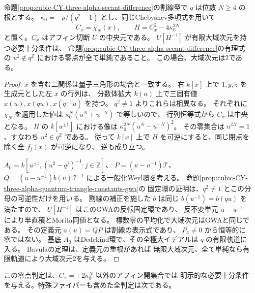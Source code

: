 \begin{proposition}\label{prop:cubic-CY-three-alpha-secant-finite-affine-open}
命題\ref{prop:cubic-CY-three-alpha-secant-difference}の割線型で
$q$ は位数 $N\ge4$ の根とする。
$\kappa_0=-\rho/(q^2-1)$ とし、同じChebyshev多項式を用いて
\[
 C_x=\chi_N(x),\qquad H=C_x^2-4\kappa_0^{2N}
\]
と置く。$C_x$ はアフィン切断 $U$ の中央元である。
$U[H^{-1}]$ が有限大域次元を持つ必要十分条件は、
命題\ref{prop:cubic-CY-three-alpha-secant-difference}の有理式の
$u^2\notin q^{\mathbb Z}$ における零点が全て単純であること。
この場合、大域次元は2である。
\end{proposition}
\begin{proof}
$x$ を含む二関係は量子三角形の場合と一致する。
右 $k[x]$ 上で $1,y,z$ を生成元とした左 $x$ の行列は、
分数体拡大 $k(u)$ 上で三固有値 $x(u),x(qu),x(q^{-1}u)$ を持つ。
$q^2\ne1$ よりこれらは相異なる。
それぞれに $\chi_N$ を適用した値は $\kappa_0^N(u^N+u^{-N})$ で等しいので、
行列恒等式から $C_x$ は中央となる。
$H$ の $k[u^{\pm1}]$ における像は
$\kappa_0^{2N}(u^N-u^{-N})^2$。
その零集合は $u^{2N}=1$、すなわち $u^2\in q^{\mathbb Z}$ である。
従って $k[x]$ 上で $H$ を可逆にすると、同じ閉点を除く全 $f_j(x)$ が可逆になり、
逆も成り立つ。

$A_0=k[u^{\pm1},(u^2-q^j)^{-1}:j\in\mathbb Z]$、
$P=(u-u^{-1})\mathcal T$、$Q=(u-u^{-1})b(u)\mathcal T^{-1}$
による一般化Weyl環を考える。
命題\ref{prop:cubic-CY-three-alpha-quantum-triangle-constants-gwa}の
固定環の証明は、$q^2\ne1$ とこの分母の可逆性だけを用いる。
割線の補正を施した $b$ は同じ $b(u^{-1})=b(qu)$ を満たすので、
$U[H^{-1}]$ はこのGWAの反転固定環であり、
反不変単元 $u-u^{-1}$ により半直積とMorita同値となる。
標数零の平均化で大域次元はGWAと同じである。
その定義元 $a(u)=QP$ は割線の表示式であり、
$P_x\ne0$ から恒等的に零ではない。
基底 $A_0$ はDedekind環で、その全極大イデアルは $q$ の有限軌道に入る。
Bavulaの定理\cite[Theorem 3.1]{BavulaGWAOverview}は、定義元の重根があれば
無限大域次元、全て単純なら有限軌道により大域次元2を与える。
\end{proof}

この零点判定は、$C_x=\pm2\kappa_0^N$ 以外のアフィン開集合では
明示的な必要十分条件を与える。特殊ファイバーも含めた全判定は次である。

